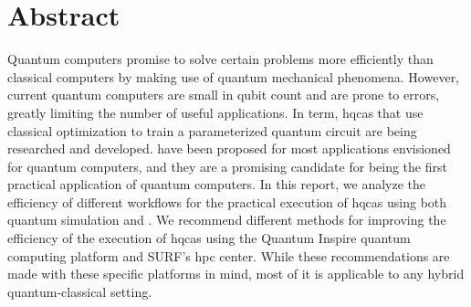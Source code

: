 \documentclass[a4paper,11pt]{report}
\begin{document}
\chapter*{Abstract}
Quantum computers promise to solve certain problems more efficiently than classical computers by making use of quantum mechanical phenomena.
However, current quantum computers are small in qubit count and are prone to errors, greatly limiting the number of useful applications.
In term, \glspl{hqca} that use classical optimization to train a parameterized quantum circuit are being researched and developed.
 have been proposed for most applications envisioned for quantum computers, and they are a promising candidate for being the first practical application of quantum computers.
In this report, we analyze the efficiency of different workflows for the practical execution of \glspl{hqca} using both quantum simulation and .
We recommend different methods for improving the efficiency of the execution of \glspl{hqca} using the Quantum Inspire quantum computing platform and SURF's \acrlong{hpc} center.
While these recommendations are made with these specific platforms in mind, most of it is applicable to any hybrid quantum-classical setting.

\glsunsetall
\cleardoublepage
\tableofcontents

\cleardoublepage
\listoffigures

\cleardoublepage
\listoftables
\glsresetall

\cleardoublepage
{}











\cleardoublepage
\printbibliography[heading=bibintoc]

\cleardoublepage
\printnoidxglossaries

\begin{appendices}
\appendix

\end{appendices}
\end{document}

